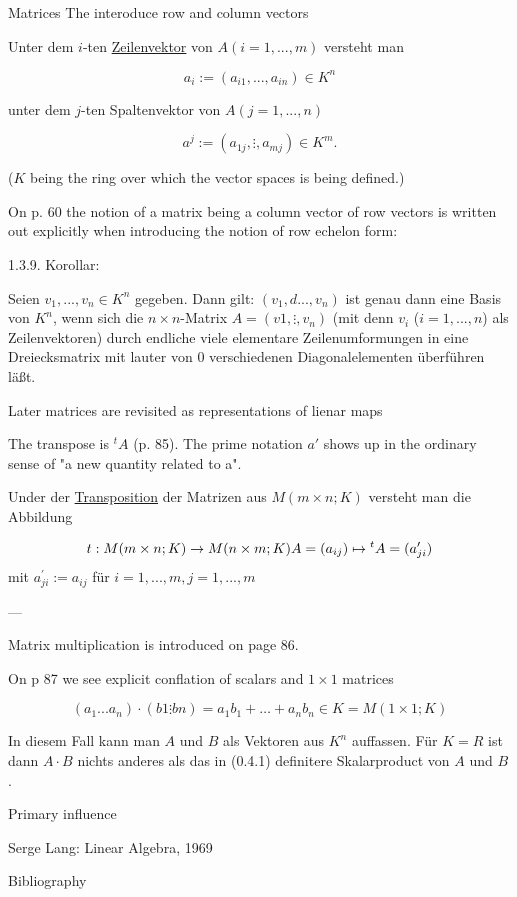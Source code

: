 Matrices The interoduce row and column vectors

Unter dem $i$-ten \underline{Zeilenvektor} von $A (i=1, ..., m)$ versteht man

\[
a_i := (a_{i1}, ..., a_{in}) \in K^n
\]

unter dem $j$-ten Spaltenvektor von $A (j=1, ..., n)$

\[
a^j := (a_{1j}, \vdots, a_{mj}) \in K^m.
\]

($K$ being the ring over which the vector spaces is being defined.)

On p. 60 the notion of a matrix being a column vector of row vectors is written out explicitly when introducing the notion of row echelon form:

1.3.9. Korollar:

Seien $v_1, ..., v_n \in K^n$ gegeben. Dann gilt:
$(v_1, d..., v_n)$ ist genau dann eine Basis von $K^n$, wenn sich die $n\times n$-Matrix $A = (v1, \vdots, v_n)$ (mit denn $v_i$ ($i=1,...,n$) als Zeilenvektoren)
durch endliche viele elementare Zeilenumformungen in eine Dreiecksmatrix mit lauter von 0 verschiedenen Diagonalelementen überführen läßt.

Later matrices are revisited as representations of lienar maps

The transpose is ${}^t A$ (p. 85). The prime notation $a'$ shows up in the ordinary sense of "a new quantity related to a".

Under der \underline{Transposition} der Matrizen aus $M(m\times n; K)$ versteht man die Abbildung

\[
t: M(m\times n; K) \rightarrow M(n \times m; K) \\
A = (a_{ij}) \mapsto {}^t A = (a^\prime_{ji})
\]
mit $a^\prime_{ji} := a_{ij}$ für $i=1,...,m, j=1,..., m$

---

Matrix multiplication is introduced on page 86.

On p 87 we see explicit conflation of scalars and $1\times1$ matrices

\[
(a_1...a_n) \cdot (b1 \vdots bn) = a_1 b_1 + \dots + a_n b_n \in K = M(1\times 1; K)\]

In diesem Fall kann man $A$ und $B$ als Vektoren aus $K^n$ auffassen. Für $K=R$ ist dann $A\cdot B$ nichts anderes als das in (0.4.1) definitere Skalarproduct von $A$ und $B$.

Primary influence

Serge Lang: Linear Algebra, 1969

Bibliography

